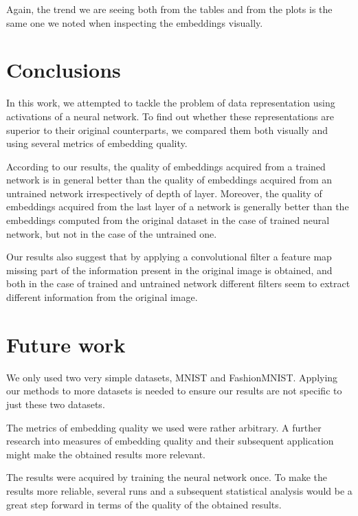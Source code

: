 \documentclass{article}
\begin{document}
Again, the trend we are seeing both from the tables and from the plots is the
same one we noted when inspecting the embeddings visually.

\section{Conclusions}
In this work, we attempted to tackle the problem of data representation using
activations of a neural network. To find out whether these representations
are superior to their original counterparts, we compared them both visually
and using several metrics of embedding quality.

According to our results, the quality of embeddings acquired from a trained
network is in general better than the quality of embeddings acquired from
an untrained network irrespectively of depth of layer. Moreover, the quality
of embeddings acquired from the last layer of a network is generally better
than the embeddings computed from the original dataset in the case of
trained neural network, but not in the case of the untrained one.

Our results also suggest that by applying a convolutional filter a feature
map missing part of the information present in the original image is
obtained, and both in the case of trained and untrained network different
filters seem to extract different information from the original image.

\section{Future work}
We only used two very simple datasets, MNIST and FashionMNIST. Applying
our methods to more datasets is needed to ensure our results are not
specific to just these two datasets.

The metrics of embedding quality we used were rather arbitrary. A further
research into measures of embedding quality and their subsequent application
might make the obtained results more relevant.

The results were acquired by training the neural network once. To make
the results more reliable, several runs and a subsequent statistical
analysis would be a great step forward in terms of the quality of the
obtained results.
\end{document}
